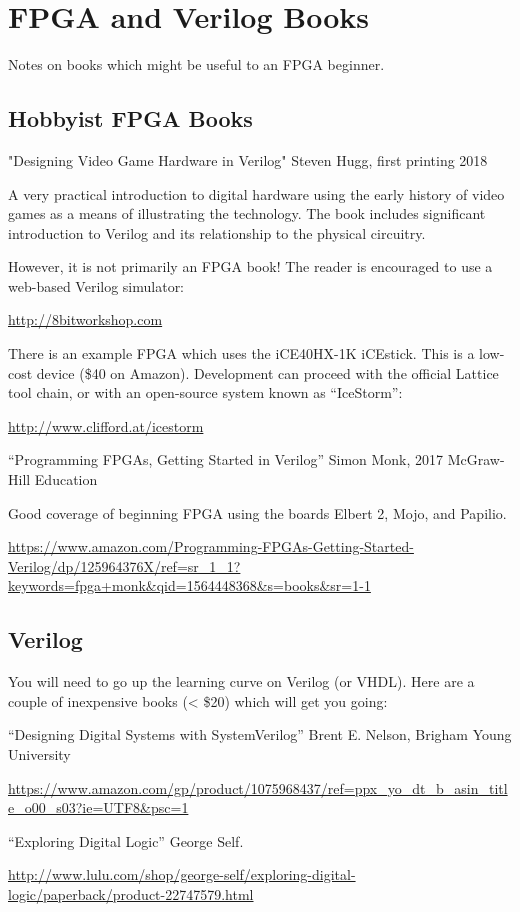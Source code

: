\section{FPGA and Verilog Books}

Notes on books which might be useful to an FPGA beginner.

\subsection{Hobbyist FPGA Books}

"Designing Video Game Hardware in Verilog"
Steven Hugg, first printing 2018

A very practical introduction to digital hardware using the early history of video games as a means of illustrating the technology.
The book includes significant introduction to Verilog and its relationship to the physical circuitry.

However, it is not primarily an FPGA book!  The reader is encouraged to use a web-based Verilog simulator:

\url{http://8bitworkshop.com}

There is an example FPGA which uses the iCE40HX-1K iCEstick.
This is a low-cost device (\$40 on Amazon).  Development can proceed
with the official Lattice tool chain, or with an open-source system
known as ``IceStorm'':

\url{http://www.clifford.at/icestorm}

``Programming FPGAs, Getting Started in Verilog''
Simon Monk, 2017 McGraw-Hill Education

Good coverage of beginning FPGA using the boards Elbert 2, Mojo, and Papilio.

\begin{footnotesize}
\url{https://www.amazon.com/Programming-FPGAs-Getting-Started-Verilog/dp/125964376X/ref=sr_1_1?keywords=fpga+monk&qid=1564448368&s=books&sr=1-1}
\end{footnotesize}

\subsection{Verilog}

You will need to go up the learning curve on Verilog (or VHDL).
Here are a couple of inexpensive books (< \$20) which will get you going:

``Designing Digital Systems with SystemVerilog''
Brent E. Nelson, Brigham Young University

\begin{footnotesize}
\url{https://www.amazon.com/gp/product/1075968437/ref=ppx_yo_dt_b_asin_title_o00_s03?ie=UTF8&psc=1}
\end{footnotesize}

``Exploring Digital Logic''
George Self.

\begin{footnotesize}
\url{http://www.lulu.com/shop/george-self/exploring-digital-logic/paperback/product-22747579.html}
\end{footnotesize}


